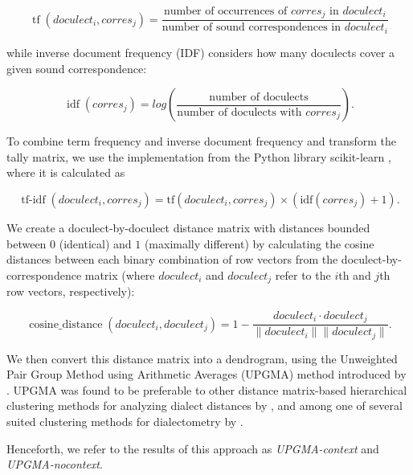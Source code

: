 \documentclass[a4paper]{article}
\begin{document}
\begin{equation*}
\operatorname{tf}(doculect_i, corres_j) =
\frac{\text{number of occurrences of } corres_j \text{ in } doculect_i}
{\text{number of sound correspondences in } doculect_i}
\end{equation*}

while inverse document frequency (IDF)
considers how many doculects cover a given
sound correspondence:

\begin{equation*}
\operatorname{idf}(corres_j) =
log(
\frac{\text{number of doculects}}
{\text{number of doculects with } corres_j}
).
\end{equation*}

To combine term frequency and inverse document frequency
and transform the tally matrix, 
we use the implementation from the Python library scikit-learn
\citep{pedregosa2011scikit-learn},
where it is calculated as

\begin{equation*}
\operatorname{tf-idf}(doculect_i, corres_j) =
\text{tf}(doculect_i, corres_j)
\times
(
\text{idf}(corres_j)
+ 1).
\end{equation*}

We create a doculect-by-doculect distance matrix
with distances bounded between $0$ (identical) and $1$ (maximally different)
by calculating the cosine distances between each
binary combination of row vectors from the doculect-by-correspondence matrix
(where $doculect_i$ and $doculect_j$ refer to the $i$th and $j$th row vectors, respectively):

\begin{equation*}
\operatorname{cosine\_distance}(doculect_i,doculect_j) =
1 -
\frac{doculect_i \cdot doculect_j}{\lVert doculect_i \rVert \lVert doculect_j \rVert}
.
\end{equation*}

We then convert this distance matrix into a dendrogram,
using the
Unweighted Pair Group Method using Arithmetic Averages
(UPGMA) method introduced by \citet{sokal1958statistical}.
UPGMA was found to be preferable to other
distance matrix-based hierarchical clustering methods
for analyzing dialect distances by \citet{heeringa2004measuring},
and among one of several suited clustering methods for dialectometry
by \citet{prokic2008recognizing}.

Henceforth, we refer to the results of this approach
as \textit{UPGMA-context} and \textit{UPGMA-nocontext}.
\end{document}
